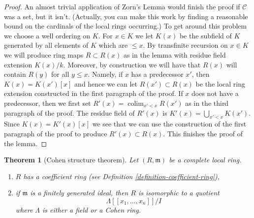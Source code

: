 \documentclass{amsart}
\theoremstyle{plain}
\newtheorem{theorem}[subsection]{Theorem}
\theoremstyle{definition}
\theoremstyle{remark}
\numberwithin{equation}{subsection}
\def\colim{\mathop{\mathrm{colim}}\nolimits}
\begin{document}
\begin{proof}
\medskip\noindent
An almost trivial application of Zorn's Lemma would finish the proof
if $\mathcal{C}$ was a set, but it isn't.
(Actually, you can make this work by finding a reasonable bound on the
cardinals of the local rings occurring.)
To get around this problem we choose a well ordering on $K$.
For $x \in K$ we let $K(x)$ be the subfield of $K$ generated
by all elements of $K$ which are $\leq x$.
By transfinite recursion on $x \in K$ we will produce ring maps
$R \subset R(x)$ as in the lemma with residue field extension
$K(x)/k$. Moreover, by construction we will have that
$R(x)$ will contain $R(y)$ for all $y \leq x$.
Namely, if $x$ has a predecessor $x'$, then $K(x) = K(x')[x]$
and hence we can let $R(x') \subset R(x)$ be the local ring extension
constructed in the first paragraph of the proof. If $x$ does not
have a predecessor, then we first set
$R'(x) = \colim_{x' < x} R(x')$ as in the third paragraph
of the proof. The residue field of $R'(x)$ is $K'(x) = \bigcup_{x' < x} K(x')$.
Since $K(x) = K'(x)[x]$ we see that we can use the construction of the
first paragraph of the proof to produce $R'(x) \subset R(x)$.
This finishes the proof of the lemma.
\end{proof}

\begin{theorem}[Cohen structure theorem]
\label{theorem-cohen-structure-theorem}
Let $(R, \mathfrak m)$ be a complete local ring.
\begin{enumerate}
\item $R$ has a coefficient ring (see
Definition \ref{definition-coefficient-ring}),
\item if $\mathfrak m$ is a finitely generated ideal, then
$R$ is isomorphic to a quotient
$$
\Lambda[[x_1, \ldots, x_n]]/I
$$
where $\Lambda$ is either a field or a Cohen ring.
\end{enumerate}
\end{theorem}
\end{document}

